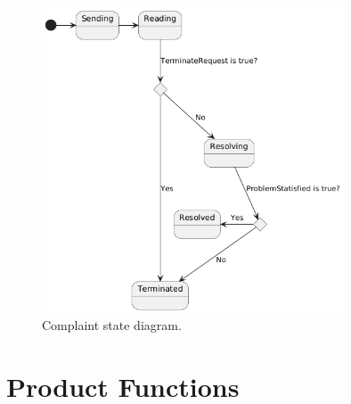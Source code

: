 \begin{figure}[H]
        \centering
        \includegraphics[width=0.8\textwidth]{Assets/Statecharts/Complain_SC.png}
        \caption{Complaint state diagram.}
        \label{fig:Complaint state diagram.}
    \end{figure}
\section{Product Functions}
